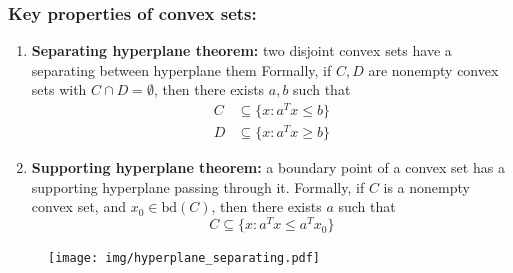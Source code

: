 \documentclass[a4paper]{article}
\begin{document}
{\subsubsection{Key properties of convex sets:}
\begin{enumerate}
  \item \textbf{Separating hyperplane theorem:} two disjoint convex sets have a separating between hyperplane them
  Formally, if $C, D$ are nonempty convex sets with $C\cap  D = \emptyset $, then there exists $a, b$ such that
  \begin{align*}
    C & \subseteq \{x : a^T x \leq b\} \\
    D & \subseteq \{x : a^T x \geq b\} 
  \end{align*}
  \item \textbf{Supporting hyperplane theorem:} a boundary point of a convex set has a supporting hyperplane passing through it. Formally, if $C$ is a nonempty convex set, and $x_0 \in \text{bd}(C)$, then there exists $a$ such that 
  \begin{equation}
    C \subseteq \{x : a^T x \leq a^T x_0\}  \nonumber 
  \end{equation}
\end{enumerate}

\begin{figure}[htbp] 
  \centering 
  \texttt{[image: img/hyperplane\_separating.pdf]} 
\end{figure}

}
\end{document}
